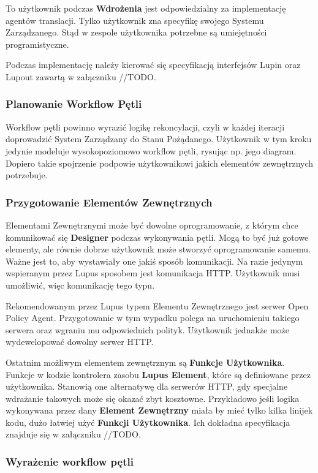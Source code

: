 To użytkownik podczas \textbf{Wdrożenia} jest odpowiedzialny za implementację agentów translacji. Tylko użytkownik zna specyfikę swojego Systemu Zarządzanego. Stąd w zespole użytkownika potrzebne są umiejętności programistyczne. 

Podczas implementację należy kierować się specyfikacją interfejsów Lupin oraz Lupout zawartą w załączniku //TODO.

\subsubsection{Planowanie Workflow Pętli}

Workflow pętli powinno wyrazić logikę rekoncylacji, czyli w każdej iteracji doprowadzić System Zarządzany do Stanu Pożądanego. Użytkownik w tym kroku jedynie modeluje wysokopoziomowo workflow pętli, rysując np. jego diagram. Dopiero takie spojrzenie podpowie użytkownikowi jakich elementów zewnętrznych potrzebuje.

\subsubsection{Przygotowanie Elementów Zewnętrznych}

Elementami Zewnętrznymi może być dowolne oprogramowanie, z którym chce komunikować się \textbf{Designer} podczas wykonywania pętli. Mogą to być już gotowe elementy, ale równie dobrze użytkownik może stworzyć oprogramowanie samemu. Ważne jest to, aby wystawiały one jakiś sposób komunikacji. Na razie jedynym wspieranym przez Lupus sposobem jest komunikacja HTTP. Użytkownik musi umożliwić, więc komunikację tego typu.

Rekomendowanym przez Lupus typem Elementu Zewnętrznego jest serwer Open Policy Agent. Przygotowanie w tym wypadku polega na uruchomieniu takiego serwera oraz wgraniu mu odpowiednich polityk. Użytkownik jednakże może wydewelopować dowolny serwer HTTP.

Ostatnim możliwym elementem zewnętrznym są \textbf{Funkcje Użytkownika}. Funkcje w kodzie kontrolera zasobu \textbf{Lupus Element}, które są definiowane przez użytkownika. Stanowią one alternatywę dla serwerów HTTP, gdy specjalne wdrażanie takowych może się okazać zbyt kosztowne. Przykładowo jeśli logika wykonywana przez dany \textbf{Element Zewnętrzny} miała by mieć tylko kilka linijek kodu, dużo łatwiej użyć \textbf{Funkcji Użytkownika}. Ich dokładna specyfikacja znajduje się w załączniku //TODO.

\subsubsection{Wyrażenie workflow pętli}

